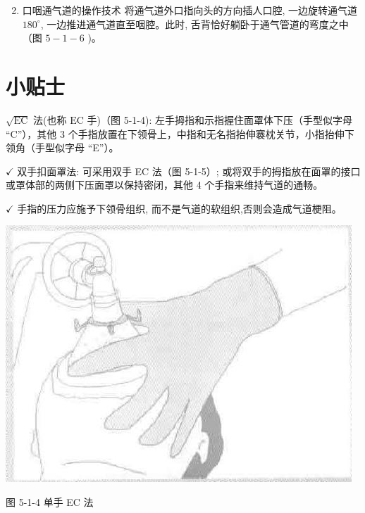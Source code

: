 \documentclass[10pt]{article}
\begin{document}
\begin{enumerate}
  \setcounter{enumi}{1}
  \item 口咽通气道的操作技术 将通气道外口指向头的方向插人口腔, 一边旋转通气道 $180^{\circ}$, 一边推进通气道直至咽腔。此时, 舌背恰好躺卧于通气管道的弯度之中（图 $5-1-6$ )。
\end{enumerate}

\section*{小贴士}
$\sqrt{\mathrm{EC}}$ 法(也称 $\mathrm{EC}$ 手)（图 5-1-4): 左手拇指和示指握住面罩体下压（手型似字母 “C”），其他 3 个手指放置在下领骨上，中指和无名指抬伸褰枕关节，小指抬伸下领角（手型似字母 “E”）。

$\checkmark$ 双手扣面罩法: 可采用双手 EC 法（图 5-1-5）; 或将双手的拇指放在面罩的接口或罩体部的两侧下压面罩以保持密闭，其他 4 个手指来维持气道的通畅。

$\checkmark$ 手指的压力应施予下领骨组织, 而不是气道的软组织,否则会造成气道梗阻。

\begin{center}
\includegraphics[max width=\textwidth]{2024_07_05_645bb794a4d4f32ee0c8g-285}
\end{center}

图 5-1-4 单手 EC 法
\end{document}
